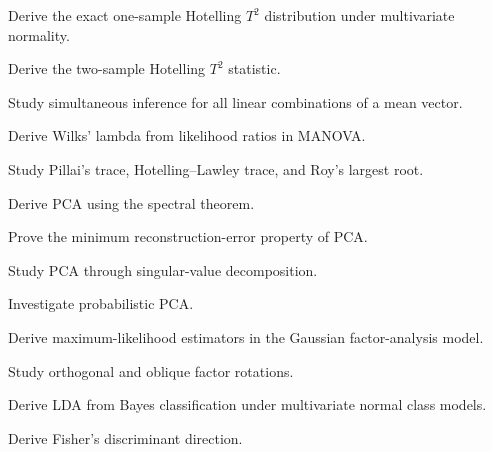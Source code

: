 \begin{exercise}[4]
Derive the exact one-sample Hotelling \(T^2\) distribution under
multivariate normality.
\end{exercise}

\begin{exercise}[4]
Derive the two-sample Hotelling \(T^2\) statistic.
\end{exercise}

\begin{exercise}[4]
Study simultaneous inference for all linear combinations of a mean
vector.
\end{exercise}

\begin{exercise}[4]
Derive Wilks' lambda from likelihood ratios in MANOVA.
\end{exercise}

\begin{exercise}[4]
Study Pillai's trace, Hotelling--Lawley trace, and Roy's largest root.
\end{exercise}

\begin{exercise}[4]
Derive PCA using the spectral theorem.
\end{exercise}

\begin{exercise}[4]
Prove the minimum reconstruction-error property of PCA.
\end{exercise}

\begin{exercise}[4]
Study PCA through singular-value decomposition.
\end{exercise}

\begin{exercise}[4]
Investigate probabilistic PCA.
\end{exercise}

\begin{exercise}[4]
Derive maximum-likelihood estimators in the Gaussian factor-analysis
model.
\end{exercise}

\begin{exercise}[4]
Study orthogonal and oblique factor rotations.
\end{exercise}

\begin{exercise}[4]
Derive LDA from Bayes classification under multivariate normal class
models.
\end{exercise}

\begin{exercise}[4]
Derive Fisher's discriminant direction.
\end{exercise}

